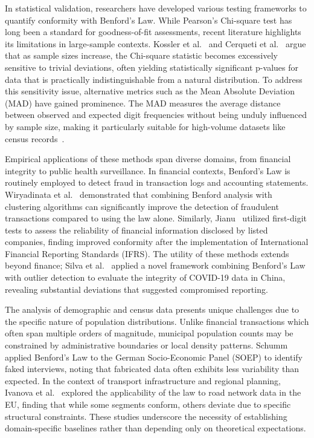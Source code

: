 \documentclass[11pt,a4paper]{article}
\begin{document}
In statistical validation, researchers have developed various testing frameworks to quantify conformity with Benford's Law. While Pearson's Chi-square test has long been a standard for goodness-of-fit assessments, recent literature highlights its limitations in large-sample contexts. Kossler et al.~\cite{Kossler2024SomeNI} and Cerqueti et al.~\cite{Cerqueti2021SomeNT} argue that as sample sizes increase, the Chi-square statistic becomes excessively sensitive to trivial deviations, often yielding statistically significant p-values for data that is practically indistinguishable from a natural distribution. To address this sensitivity issue, alternative metrics such as the Mean Absolute Deviation (MAD) have gained prominence. The MAD measures the average distance between observed and expected digit frequencies without being unduly influenced by sample size, making it particularly suitable for high-volume datasets like census records~\cite{Azevedo2021ABL}.

Empirical applications of these methods span diverse domains, from financial integrity to public health surveillance. In financial contexts, Benford's Law is routinely employed to detect fraud in transaction logs and accounting statements. Wiryadinata et al.~\cite{Wiryadinata2023TheUO} demonstrated that combining Benford analysis with clustering algorithms can significantly improve the detection of fraudulent transactions compared to using the law alone. Similarly, Jianu~\cite{Jianu2021ReliabilityOF} utilized first-digit tests to assess the reliability of financial information disclosed by listed companies, finding improved conformity after the implementation of International Financial Reporting Standards (IFRS). The utility of these methods extends beyond finance; Silva et al.~\cite{Silva2024ANA} applied a novel framework combining Benford's Law with outlier detection to evaluate the integrity of COVID-19 data in China, revealing substantial deviations that suggested compromised reporting.

The analysis of demographic and census data presents unique challenges due to the specific nature of population distributions. Unlike financial transactions which often span multiple orders of magnitude, municipal population counts may be constrained by administrative boundaries or local density patterns. Schumm~\cite{Schafer2005AutomatieIO} applied Benford's Law to the German Socio-Economic Panel (SOEP) to identify faked interviews, noting that fabricated data often exhibits less variability than expected. In the context of transport infrastructure and regional planning, Ivanova et al.~\cite{Ivanova2025BenfordsLA} explored the applicability of the law to road network data in the EU, finding that while some segments conform, others deviate due to specific structural constraints. These studies underscore the necessity of establishing domain-specific baselines rather than depending only on theoretical expectations.
\end{document}
